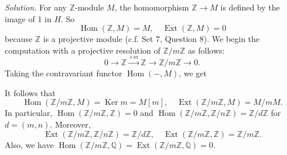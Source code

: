 \documentclass{mathproblems}
\newcommand\Q{\mathbb{Q}}
\newcommand\Z{\mathbb{Z}}
\DeclareMathOperator{\Ext}{Ext}
\DeclareMathOperator{\Hom}{Hom}
\DeclareMathOperator{\Ker}{Ker}
\begin{document}
\begin{questions}
\textit{Solution.} For any $\Z$-module $M$, the homomorphism $\Z\to M$ is defined by the image of 1 in $H$. So 
$$
\Hom(\Z,M)=M,\quad \Ext(\Z,M)=0
$$
because $\Z$ is a projective module (c.f. Set 7, Question 8). We begin the computation with a projective resolution of $\Z/m\Z$ as follows:
$$
0\longrightarrow \Z \stackrel{\times m}{\longrightarrow} \Z \longrightarrow \Z/m\Z\longrightarrow 0.
$$
Taking the contravariant functor $\Hom(-,M)$, we get \vspace{-4pt}
\begin{center}
\end{center}\vspace{-4pt}
It follows that
$$
\Hom(\Z/m\Z,M)=\Ker m=M[m],\quad \Ext(\Z/m\Z,M)=M/mM.
$$
In particular, $\Hom(\Z/m\Z,\Z)=0$ and $\Hom(\Z/m\Z,\Z/n\Z)=\Z/d\Z$ for $d=(m,n)$. Moreover,
$$
\Ext(\Z/m\Z,\Z/n\Z)=\Z/d\Z,\quad \Ext(\Z/m\Z,\Z)=\Z/m\Z.
$$
Also, we have $\Hom(\Z/m\Z,\Q)=\Ext(\Z/m\Z,\Q)=0$.





\end{questions}
\end{document}
